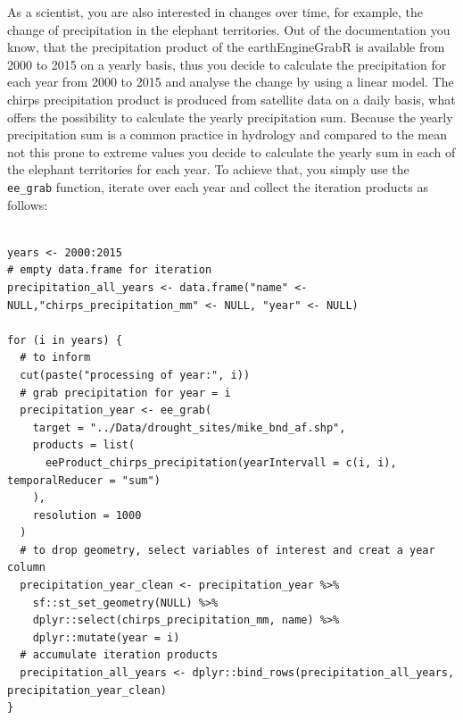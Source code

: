\documentclass[12pt,twoside,a4paper,final]{report}
\begin{document}
As a scientist, you are also interested in changes over time, for example, the change of precipitation in the elephant territories. Out of the documentation you know, that the precipitation product of the earthEngineGrabR is available from 2000 to 2015 on a yearly basis, thus you decide to calculate the precipitation for each year from 2000 to 2015 and analyse the change by using a linear model. The chirps precipitation product is produced from satellite data on a daily basis, what offers the possibility to calculate the yearly precipitation sum. Because the yearly precipitation sum is a common practice in hydrology and compared to the mean not this prone to extreme values you decide to calculate the yearly sum in each of the elephant territories for each year. To achieve that, you simply use the \texttt{ee\_grab} function, iterate over each year and collect the iteration products as follows:

\begin{lstlisting}

years <- 2000:2015
# empty data.frame for iteration
precipitation_all_years <- data.frame("name" <- NULL,"chirps_precipitation_mm" <- NULL, "year" <- NULL)

for (i in years) {
  # to inform
  cut(paste("processing of year:", i))
  # grab precipitation for year = i
  precipitation_year <- ee_grab(
    target = "../Data/drought_sites/mike_bnd_af.shp",
    products = list(
      eeProduct_chirps_precipitation(yearIntervall = c(i, i), temporalReducer = "sum")
    ),
    resolution = 1000
  )
  # to drop geometry, select variables of interest and creat a year column
  precipitation_year_clean <- precipitation_year %>% 
    sf::st_set_geometry(NULL) %>% 
    dplyr::select(chirps_precipitation_mm, name) %>% 
    dplyr::mutate(year = i)
  # accumulate iteration products
  precipitation_all_years <- dplyr::bind_rows(precipitation_all_years, precipitation_year_clean)
}
\end{lstlisting}
\end{document}
